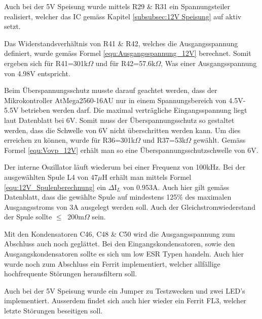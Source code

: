 Auch bei der 5V Speisung wurde mittels R29 \& R31 ein Spannungsteiler realisiert, welcher das IC gemäss Kapitel \ref{subsubsec:12V Speisung} auf aktiv setzt.

Das Widerstandsverhältnis von R41 \& R42, welches die Ausgangsspannung definiert, wurde gemäss Formel \ref{equ:Ausgangsspannung_12V} berechnet. Somit ergeben sich für R41=301k$\Omega$ und für R42=57.6k$\Omega$, Was einer Ausgangsspannung von 4.98V entspricht. \cite[S.10]{monolithic_power_systems_mp24943_2011} 

Beim Überspannungsschutz musste darauf geachtet werden, dass der Mikrokontroller AtMega2560-16AU nur in einem Spannungsbereich von 4.5V-5.5V betrieben werden darf. Die maximal verträgliche Eingangsspannung liegt laut Datenblatt bei 6V. Somit muss der Überspannungsschutz so gestaltet werden, dass die Schwelle von 6V nicht überschritten werden kann. Um dies erreichen zu können, wurde für R36=301k$\Omega$ und R37=53k$\Omega$ gewählt. Gemäss Formel \ref{equ:Vovp_12V} erhält man so eine Überspannungsschutzschwelle von 6V. \cite[S.1]{atmel_atmel_2014} \cite[S.10]{monolithic_power_systems_mp24943_2011}

Der interne Oszillator läuft wiederum bei einer Frequenz von 100kHz. Bei der ausgewählten Spule L4 von 47$\mu$H erhält man mittels Formel \ref{equ:12V_Spulenberechnung} ein $\Delta$I$_{L}$ von 0.953A. Auch hier gilt gemäss Datenblatt, dass die gewählte Spule auf mindestens 125\% des maximalen Ausgangsstroms von 3A ausgelegt werden soll. Auch der Gleichstromwiederstand der Spule sollte $ \leq \ $ 200m$\Omega$  sein. \cite[S.3]{monolithic_power_systems_mp24943_2011} \cite[S.10]{monolithic_power_systems_mp24943_2011} 

Mit den Kondensatoren C46, C48 \& C50 wird die Ausgangsspannung zum Abschluss auch noch geglättet. Bei den Eingangskondensatoren, sowie den Ausgangskondensatoren sollte es sich um low ESR Typen handeln. Auch hier wurde noch zum Abschluss ein Ferrit implementiert, welcher allfällige hochfrequente Störungen herausfiltern soll.

Auch bei der 5V Speisung wurde ein Jumper zu Testzwecken und zwei LED's implementiert. Ausserdem findet sich auch hier wieder ein Ferrit FL3, welcher letzte Störungen beseitigen soll. 


